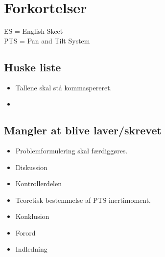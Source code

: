 \section*{Forkortelser}

ES = English Skeet \\
PTS = Pan and Tilt System

\subsection*{Huske liste}
\begin{itemize}
\item Tallene skal stå kommaspereret.
\item {}
\end{itemize}



\subsection*{Mangler at blive laver/skrevet}
\begin{itemize}
\item Problemformulering skal færdiggøres. 
\item Diskussion
\item Kontrollerdelen
\item Teoretisk bestemmelse af PTS inertimoment. 
\item Konklusion
\item Forord
\item Indledning

\listoftodos

\end{itemize}